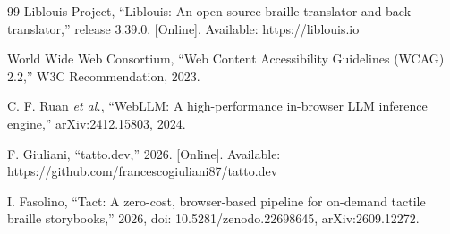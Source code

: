 \documentclass[conference]{IEEEtran}
\begin{document}
\begin{thebibliography}{99}
 Liblouis Project, ``Liblouis: An open-source braille translator and back-translator,'' release 3.39.0. [Online]. Available: https://liblouis.io

 World Wide Web Consortium, ``Web Content Accessibility Guidelines (WCAG) 2.2,'' W3C Recommendation, 2023.

 C. F. Ruan \emph{et al.}, ``WebLLM: A high-performance in-browser LLM inference engine,'' arXiv:2412.15803, 2024.

 F. Giuliani, ``tatto.dev,'' 2026. [Online]. Available: https://github.com/francescogiuliani87/tatto.dev

 I. Fasolino, ``Tact: A zero-cost, browser-based pipeline for on-demand tactile braille storybooks,'' 2026, doi: 10.5281/zenodo.22698645, arXiv:2609.12272.

\end{thebibliography}
\end{document}
